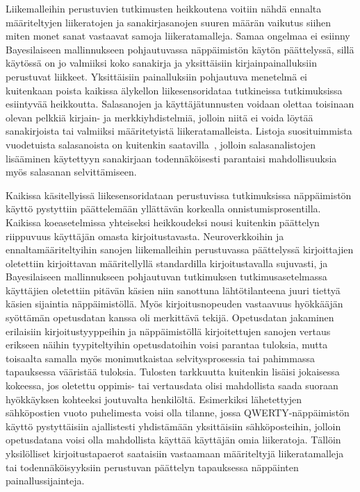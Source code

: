 \documentclass[finnish]{tktltiki2}
\theoremstyle{definition}
\theoremstyle{remark}
\begin{document}
Liikemalleihin perustuvien tutkimusten heikkoutena voitiin nähdä ennalta määriteltyjen liikeratojen ja sanakirjasanojen suuren määrän vaikutus siihen miten monet sanat vastaavat samoja liikeratamalleja. Samaa ongelmaa ei esiinny Bayesilaiseen mallinnukseen pohjautuvassa näppäimistön käytön päättelyssä, sillä käytössä on jo valmiiksi koko sanakirja ja yksittäisiin kirjainpainalluksiin perustuvat liikkeet. Yksittäisiin painalluksiin pohjautuva menetelmä ei kuitenkaan poista kaikissa älykellon liikesensoridataa tutkineissa tutkimuksissa esiintyvää heikkoutta. Salasanojen ja käyttäjätunnusten voidaan olettaa toisinaan olevan pelkkiä kirjain- ja merkkiyhdistelmiä, jolloin niitä ei voida löytää sanakirjoista tai valmiiksi määritetyistä liikeratamalleista. Listoja suosituimmista vuodetuista salasanoista on kuitenkin saatavilla~\cite{pw}, jolloin salasanalistojen lisääminen käytettyyn sanakirjaan todennäköisesti parantaisi mahdollisuuksia myös salasanan selvittämiseen. 

Kaikissa käsitellyissä liikesensoridataan perustuvissa tutkimuksissa näppäimistön käyttö pystyttiin päättelemään yllättävän korkealla onnistumisprosentilla. Kaikissa koeasetelmissa yhteiseksi heikkoudeksi nousi kuitenkin päättelyn riippuvuus käyttäjän omasta kirjoitustavasta. Neuroverkkoihin ja ennaltamääriteltyihin sanojen liikemalleihin perustuvassa päättelyssä kirjoittajien oletettiin kirjoittavan määritellyllä standardilla kirjoitustavalla sujuvasti, ja  Bayesilaiseen mallinnukseen pohjautuvan tutkimuksen tutkimusasetelmassa käyttäjien oletettiin pitävän käsien niin sanottuna lähtötilanteena juuri tiettyä käsien sijaintia näppäimistöllä. Myös kirjoitusnopeuden vastaavuus hyökkääjän syöttämän opetusdatan kanssa oli merkittävä tekijä.
Opetusdatan jakaminen erilaisiin kirjoitustyyppeihin ja näppäimistöllä kirjoitettujen sanojen vertaus erikseen näihin tyypiteltyihin opetusdatoihin voisi parantaa tuloksia, mutta toisaalta samalla myös monimutkaistaa selvitysprosessia tai pahimmassa tapauksessa vääristää tuloksia. Tulosten tarkkuutta kuitenkin lisäisi jokaisessa kokeessa, jos oletettu oppimis- tai vertausdata olisi mahdollista saada suoraan hyökkäyksen kohteeksi joutuvalta henkilöltä. Esimerkiksi lähetettyjen sähköpostien vuoto puhelimesta voisi olla tilanne, jossa QWERTY-näppäimistön käyttö pystyttäisiin ajallistesti yhdistämään yksittäisiin sähköposteihin, jolloin opetusdatana voisi olla mahdollista käyttää käyttäjän omia liikeratoja. Tällöin yksilölliset kirjoitustapaerot saataisiin vastaamaan määriteltyjä liikeratamalleja tai todennäköisyyksiin perustuvan päättelyn tapauksessa näppäinten painallussijainteja.
\end{document}
